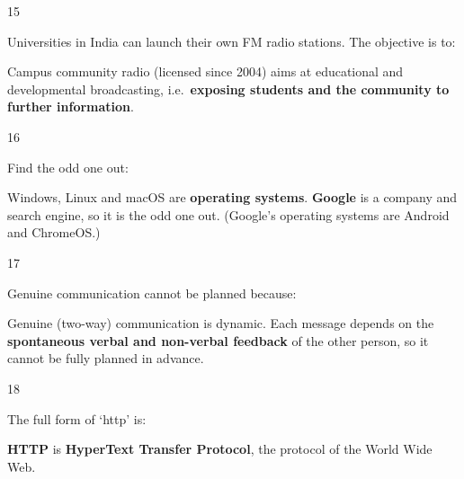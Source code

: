 \begin{question}{15}
{Universities in India can launch their own FM radio stations. The objective is to:\par}
\begin{explain}
Campus community radio (licensed since 2004) aims at educational and developmental broadcasting, i.e.\ \textbf{exposing students and the community to further information}.
\end{explain}
\end{question}

\begin{question}{16}
{Find the odd one out:\par}
\begin{explain}
Windows, Linux and macOS are \textbf{operating systems}. \textbf{Google} is a company and search engine, so it is the odd one out. (Google's operating systems are Android and ChromeOS.)
\end{explain}
\end{question}

\begin{question}{17}
{Genuine communication cannot be planned because:\par}
\begin{explain}
Genuine (two-way) communication is dynamic. Each message depends on the \textbf{spontaneous verbal and non-verbal feedback} of the other person, so it cannot be fully planned in advance.
\end{explain}
\end{question}

\begin{question}{18}
{The full form of `http' is:\par}
\begin{explain}
\textbf{HTTP} is \textbf{HyperText Transfer Protocol}, the protocol of the World Wide Web.
\end{explain}
\end{question}

